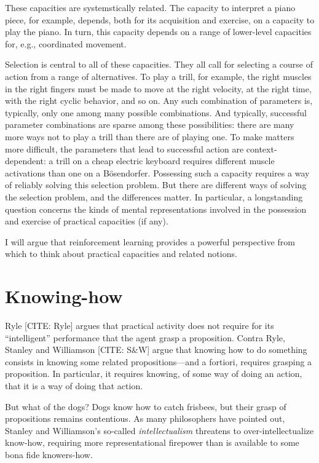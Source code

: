 
These capacities are systemstically related.
The capacity to interpret a piano piece, for example, depends, both for its acquisition and exercise, on a capacity to play the piano.
In turn, this capacity depends on a range of lower-level capacities for, e.g., coordinated movement.

Selection is central to all of these capacities.
They all call for selecting a course of action from a range of alternatives.
To play a trill, for example, the right muscles in the right fingers must be made to move at the right velocity, at the right time, with the right cyclic behavior, and so on.
Any such combination of parameters is, typically, only one among many possible combinations.
And typically, successful parameter combinations are sparse among these possibilities: there are many more ways not to play a trill than there are of playing one.
To make matters more difficult, the parameters that lead to successful action are context-dependent: a trill on a cheap electric keyboard requires different muscle activations than one on a B\"osendorfer.
Possessing such a capacity requires a way of reliably solving this selection problem.
But there are different ways of solving the selection problem, and the differences matter.
In particular, a longstanding question concerns the kinds of mental representations involved in the possession and exercise of practical capacities (if any).

I will argue that reinforcement learning provides a powerful perspective from which to think about practical capacities and related notions.

\section{Knowing-how}

Ryle [CITE: Ryle] argues that practical activity does not require for its ``intelligent'' performance that the agent grasp a proposition.
Contra Ryle, Stanley and Williamson [CITE: S\&W] argue that knowing how to do something consists in knowing some related propositions---and a fortiori, requires grasping a proposition.
In particular, it requires knowing, of some way of doing an action, that it is a way of doing that action.

But what of the dogs?
Dogs know how to catch frisbees, but their grasp of propositions remains contentious. 
As many philosophers have pointed out, Stanley and Williamson's so-called \emph{intellectualism} threatens to over-intellectualize know-how, requiring more representational firepower than is available to some bona fide knowers-how.

